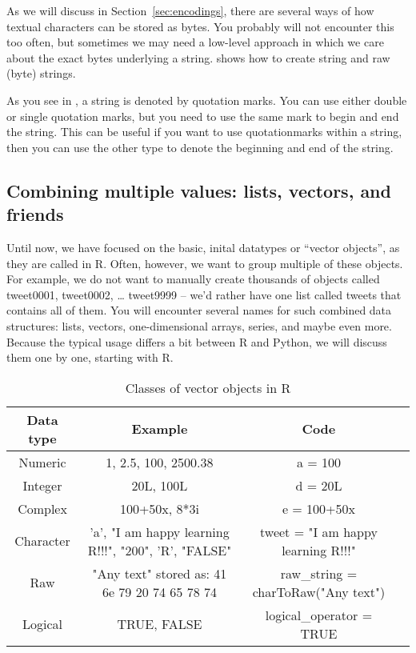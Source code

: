 
As we will discuss in Section~\ref{sec:encodings}, there are several ways of how textual characters can be stored as bytes. You probably will not encounter this too often, but sometimes we may need a low-level approach in which we care about the exact bytes underlying a string.  shows how to create string and raw (byte) strings.

As you see in , a string is denoted by quotation marks. You can use either double or single quotation marks, but you need to use the same mark to begin and end the string. This can be useful if you want to use quotationmarks within a string, then you can use the other type to denote the beginning and end of the string.




\subsection{Combining multiple values: lists, vectors, and friends}

Until now, we have focused on the basic, inital datatypes or ``vector
objects'', as they are called in R.  Often, however, we want to group
multiple of these objects. For example, we do not want to manually
create thousands of objects called tweet0001, tweet0002, \ldots
tweet9999 -- we'd rather have one list called tweets that contains all
of them. You will encounter several names for such combined data
structures: lists, vectors, one-dimensional arrays, series, and maybe
even more. Because the typical usage differs a bit between R and
Python, we will discuss them one by one, starting with R.


\begin{table}[ht]
\label{tab:vector_objects}
\caption{Classes of vector objects in R}
\centering
\begin{tabular}{c c c p{2cm}}
\hline\hline
Data type & Example & Code \\ [0.5ex]
\hline
Numeric&1, 2.5, 100, 2500.38& a = 100 \\
Integer&20L, 100L&d = 20L \\
Complex& 100+50x, 8*3i &e = 100+50x \\
Character&   \parbox[t]{4cm}{\centering 'a', "I am happy learning R!!!", "200", 'R', "FALSE"} & tweet  = "I am happy learning R!!!" \\
Raw& \parbox[t]{4cm}{\centering "Any text" stored as:  41 6e 79 20 74 65 78 74} & raw\_string  = charToRaw("Any text") \\
Logical& TRUE, FALSE & logical\_operator  = TRUE  \\ [1ex]
\hline
\end{tabular}
\label{table:nonlin}
\end{table}


